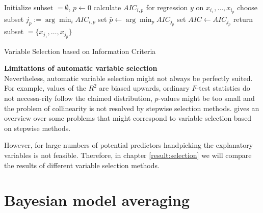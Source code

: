 \documentclass[a4paper, 11pt]{scrreprt}
\begin{document}
\begin{algorithm}
	
	Initialize subset $= \emptyset$, $p \gets 0$\;
	{
		{
			calculate $AIC_{i,p}$ for regression $y$ on $x_{i_1},\ldots, x_{i_p}$\;
		}
		choose subset $j_p := \arg\min_i AIC_{i,p}$\;
	}
	set $\bar{p} \gets \arg\min_p AIC_{j_p}$\;
	set $AIC \gets AIC_{j_p}$\;
	return subset $= \{ x_{j_1}, \ldots, x_{j_{\bar{p}}} \}$
	\caption{Variable Selection based on Information Criteria}
	\label{algo:AIC}
\end{algorithm}


\textbf{Limitations of automatic variable selection} \\
Nevertheless, automatic variable selection might not always be perfectly suited.
For example, values of the $R^2$ are biased upwards, ordinary $F$-test statistics do not necessa-rily follow the claimed distribution, $p$-values might be too small and the problem of collinearity is not resolved by stepwise selection methods.
\textcite[chapter 4.3]{harrell2015strategies} gives an overview over some problems that might correspond to variable selection based on stepwise methods. 

However, for large numbers of potential predictors handpicking the explanatory variables is not feasible. Therefore,  in chapter \ref{result:selection} we will compare the results of different variable selection methods.



\section{Bayesian model averaging}\label{par:BMA}
\end{document}
